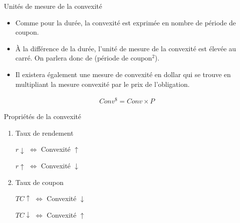 \documentclass{beamer}
\begin{document}
\begin{frame}{Unités de mesure de la convexité}
\begin{itemize}
\item Comme pour la durée,  la convexité est exprimée en nombre de période de coupon.  
\item À la différence de la durée,  l'unité de mesure de la convexité est élevée au carré.  On parlera donc de (période de coupon$^2$).  
\item Il existera également une mesure de convexité en dollar qui se trouve en multipliant la mesure convexité par le prix de l'obligation.
\end{itemize}
\begin{align*}
Conv^{\$}=Conv \times P
\end{align*}
\end{frame}

\begin{frame}{Propriétés de la convexité}
\begin{enumerate}
\item Taux de rendement
\begin{center}
$r \downarrow$ \hspace{1cm} $\Longleftrightarrow$  \hspace{1cm} Convexité $\uparrow$
\end{center}
\begin{center}
$r \uparrow$ \hspace{1cm} $\Longleftrightarrow$  \hspace{1cm} Convexité $\downarrow$
\end{center}
\item Taux de coupon
\begin{center}
$TC \uparrow$ \hspace{1cm} $\Longleftrightarrow$  \hspace{1cm} Convexité $\downarrow$
\end{center}
\begin{center}
$TC \downarrow$ \hspace{1cm} $\Longleftrightarrow$  \hspace{1cm} Convexité $\uparrow$
\end{center}
\end{enumerate}
\end{frame}
\end{document}
